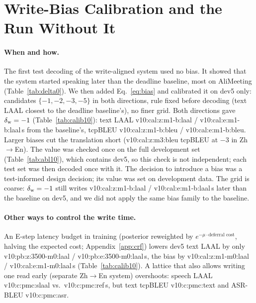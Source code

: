 

\section{Write-Bias Calibration and the Run Without It}
\label{app:calib}

\paragraph{When and how.} The first test decoding of the write-aligned system used no bias. It showed that the
system started speaking later than the deadline baseline, most on AliMeeting (Table~\ref{tab:delta0}). We then added
Eq.~\eqref{eq:bias} and calibrated it on dev5 only: candidates $\{-1,-2,-3,-5\}$ in both directions, rule fixed before
decoding (text LAAL closest to the deadline baseline's), no finer grid. Both directions gave $\delta_{\mathrm{w}}=-1$
(Table~\ref{tab:calib10}): text LAAL \num{v10:cal:z:m1-b:laal} / \num{v10:cal:e:m1-b:laal}\,s from the baseline's,
tcpBLEU \num{v10:cal:z:m1-b:bleu} / \num{v10:cal:e:m1-b:bleu}. Larger biases cut the translation short
(\num{v10:cal:z:m3:bleu} tcpBLEU at $-3$ in Zh$\rightarrow$En). The value was checked once on the full development set
(Table~\ref{tab:abl10}), which contains dev5, so this check is not independent; each test set was then decoded once with
it. The decision to introduce a bias was a test-informed design decision; its value was set on development data. The
grid is coarse: $\delta_{\mathrm{w}}=-1$ still writes \num{v10:cal:z:m1-b:laal} / \num{v10:cal:e:m1-b:laal}\,s later than the baseline
on dev5, and we did not apply the same bias family to the baseline.

\paragraph{Other ways to control the write time.} An E-step latency budget in training (posterior reweighted by
$e^{-\mu\cdot\text{deferral cost}}$, halving the expected cost; Appendix~\ref{app:crf}) lowers dev5 text LAAL by
only \num{v10:pb:z:3500-m0:laal} / \num{v10:pb:e:3500-m0:laal}\,s, the bias by \num{v10:cal:z:m1-m0:laal} /
\num{v10:cal:e:m1-m0:laal}\,s (Table~\ref{tab:calib10}). A lattice that also allows writing one read early (separate
Zh$\rightarrow$En system) overshoots: speech LAAL \num{v10:c:pmc:slaal} vs.\ \num{v10:c:pmc:ref}\,s, but text tcpBLEU
\num{v10:c:pmc:text} and ASR-BLEU \num{v10:c:pmc:asr}.





